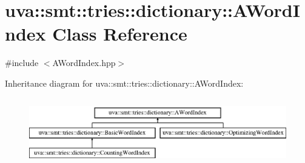 \hypertarget{classuva_1_1smt_1_1tries_1_1dictionary_1_1_a_word_index}{}\section{uva\+:\+:smt\+:\+:tries\+:\+:dictionary\+:\+:A\+Word\+Index Class Reference}
\label{classuva_1_1smt_1_1tries_1_1dictionary_1_1_a_word_index}


{\ttfamily \#include $<$A\+Word\+Index.\+hpp$>$}

Inheritance diagram for uva\+:\+:smt\+:\+:tries\+:\+:dictionary\+:\+:A\+Word\+Index\+:\begin{figure}[H]
\begin{center}
\leavevmode
\includegraphics[height=2.989324cm]{classuva_1_1smt_1_1tries_1_1dictionary_1_1_a_word_index}
\end{center}
\end{figure}
